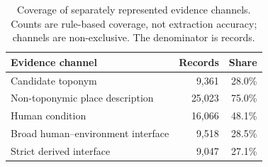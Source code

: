 \begin{table}[t]
\centering
\small
\begin{tabular}{lrr}
\toprule
Evidence channel & Records & Share \\
\midrule
Candidate toponym & 9,361 & 28.0\% \\
Non-toponymic place description & 25,023 & 75.0\% \\
Human condition & 16,066 & 48.1\% \\
Broad human--environment interface & 9,518 & 28.5\% \\
Strict derived interface & 9,047 & 27.1\% \\
\bottomrule
\end{tabular}
\caption{Coverage of separately represented evidence channels. Counts are rule-based coverage, not extraction accuracy; channels are non-exclusive. The denominator is \ArchiveRecords{} records.}
\label{tab:channels}
\end{table}
